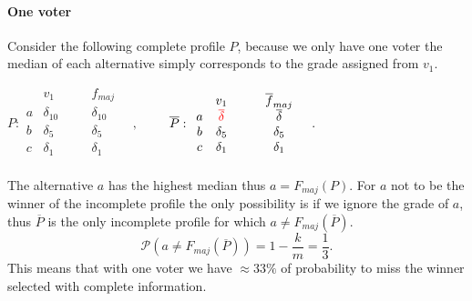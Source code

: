 \documentclass[version=3.21, pagesize, twoside=off, bibliography=totoc, DIV=calc, fontsize=12pt, a4paper]{scrartcl}
\begin{document}
\paragraph{One voter}
Consider the following complete profile $P$, because we only have one voter the median of each alternative simply corresponds to the grade assigned from $v_1$.
\begin{center}
	$P:
	\begin{array}{cccc}
		& v_1 & \quad & f_{maj} \\
		a &	\delta_{10} &\quad& \delta_{10} \\
		b &	\delta_5  &\quad& \delta_5 \\
		c &	\delta_1  &\quad& \delta_1 \\
	\end{array} \quad, \qquad
	$
	$\overline{P}:
	\begin{array}{cccc}
		& v_1 & \quad & \overline{f}_{maj} \\
		a &	{\color{red}\overline{\delta}} &\quad& \overline{\delta} \\
		b &	\delta_5  &\quad& \delta_5 \\
		c &	\delta_1  &\quad& \delta_1 \\
	\end{array} \quad.
	$
\end{center}

The alternative $a$ has the highest median thus $a=F_{maj}(P)$. For $a$ not to be the winner of the incomplete profile the only possibility is if we ignore the grade of $a$, thus $\overline{P}$ is the only incomplete profile for which $a\neq F_{maj}(\overline{P})$.
\[\mathcal{P}(a\neq F_{maj}(\overline{P}))=1-\frac{k}{m}=\frac{1}{3}.\]
This means that with one voter we have $\approx 33\%$ of probability to miss the winner selected with complete information.
\end{document}
